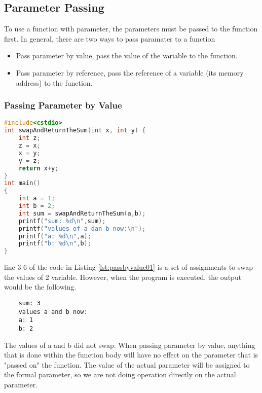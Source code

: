 \subsection{Parameter Passing} 
To use a function with parameter, the parameters must be passed to the function first.
In general, there are two ways to pass paramater to a function
\begin{itemize}
	\item Pass parameter by value, pass the value of the variable to the function.%
	\item Pass parameter by reference, pass the reference of a variable (its memory address) to the function. %
\end{itemize}

\subsubsection{Passing Parameter by Value}

\begin{lstlisting}[language=c,caption = Passing by Value,label=lst:passbyvalue01]
#include<cstdio>
int swapAndReturnTheSum(int x, int y) {
    int z;
    z = x;
    x = y;
    y = z;
    return x+y;
}
int main()
{
    int a = 1;
    int b = 2;
    int sum = swapAndReturnTheSum(a,b);
    printf("sum: %d\n",sum);
    printf("values of a dan b now:\n");
    printf("a: %d\n",a);
    printf("b: %d\n",b);
}
\end{lstlisting}

line 3-6 of the code in Listing \ref{lst:passbyvalue01} is a set of assignments to swap the values of 2 variable. However, when the program is executed, the output would be the following.
\begin{verbatim}
    sum: 3
    values a and b now:
    a: 1
    b: 2
\end{verbatim}
The values of a and b did not swap. When passing parameter by value, anything that is done within the function body will have no effect on the parameter that is "passed on" the function. The value of the actual parameter will be assigned to the formal parameter, so we are not doing operation directly on the actual parameter.

